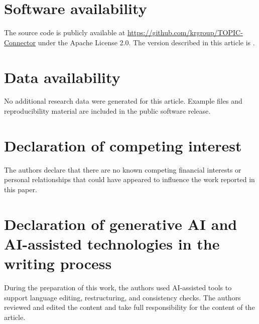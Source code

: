 \documentclass[a4paper,fleqn]{cas-dc}
\newcommand{\code}[1]{\path{#1}}
\begin{document}
\section*{Software availability}
The source code is publicly available at \url{https://github.com/krgroup/TOPIC-Connector} under the Apache License 2.0. The version described in this article is \code{v1.0.11}.

\section*{Data availability}
No additional research data were generated for this article. Example files and reproducibility material are included in the public software release.

\printcredits

\section*{Declaration of competing interest}
The authors declare that there are no known competing financial interests or personal relationships that could have appeared to influence the work reported in this paper.

\section*{Declaration of generative AI and AI-assisted technologies in the writing process}
During the preparation of this work, the authors used AI-assisted tools to support language editing, restructuring, and consistency checks. The authors reviewed and edited the content and take full responsibility for the content of the article.
\end{document}
